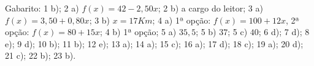  Gabarito: 1 b); 2 a) $f(x)= 42 - 2,50 x$; 2 b) a cargo do leitor; 3 a) $f(x)= 3,50 + 0,80 x$; 3 b) $x= 17 Km$; 4 a) 1ª opção: $f(x)= 100 + 12x$, 2ª opção: $f(x)= 80+15x$; 4 b) 1ª opção; 5 a) $35,5$; 5 b) $37$; 5 c) $40$; 6 d); 7 d); 8 e); 9 d); 10 b); 11 b); 12 e); 13 a); 14 a); 15 c); 16 a); 17 d); 18 c); 19 a); 20 d); 21 c); 22 b); 23 b).

 
